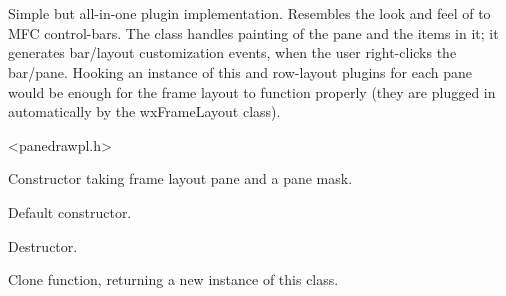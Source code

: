 %
%


\section{}\label{cbpanedrawplugin}


Simple but all-in-one plugin implementation. Resembles the look and feel of
to MFC control-bars. The class handles painting of the pane and the items in it;
it generates bar/layout customization events, when the user right-clicks the bar/pane.
Hooking an instance of this and row-layout plugins for each pane
would be enough for the frame layout to function properly
(they are plugged in automatically by the wxFrameLayout class).




<panedrawpl.h>




\label{cbpanedrawplugincbpanedrawplugin}


Constructor taking frame layout pane and a pane mask.



Default constructor.


\label{cbpanedrawplugindtor}


Destructor.


\label{cbpanedrawpluginclone}


Clone function, returning a new instance of this class.


\label{cbpanedrawplugindrawbarinnershaderect}


